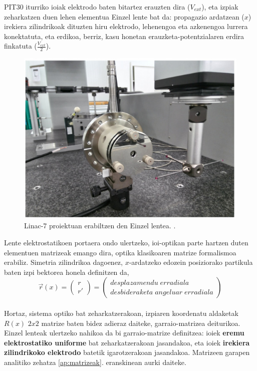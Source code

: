 \documentclass[12pt]{article}
\numberwithin{figure}{section}
\numberwithin{equation}{section}
\begin{document}
PIT30 iturriko ioiak elektrodo baten bitartez erauzten dira ($V_{ext}$), eta izpiak zeharkatzen duen lehen elementua Einzel lente bat da: propagazio ardatzean ($x$) irekiera zilindrikoak dituzten hiru elektrodo, lehenengoa eta azkenengoa lurrera konektatuta, eta erdikoa, berriz, kasu honetan erauzketa-potentzialaren erdira finkatuta ($\frac{V_{ext}}{2}$).

\begin{figure}[h]
    \centering
    \includegraphics[width=0.45\linewidth]{2 - Oinarri teorikoa/einzel lens.jpg}
    \caption{Linac-7 proiektuan erabiltzen den Einzel lentea. \cite{feuchtwanger_new_2022}.}
    \label{fig:enter-label}
\end{figure}

Lente elektrostatikoen portaera ondo ulertzeko, ioi-optikan parte hartzen duten elementuen matrizeak emango dira, optika klasikoaren matrize formalismoa erabiliz. Simetria zilindrikoa dagoenez, $x$-ardatzeko edozein posiziorako partikula baten izpi bektorea honela definitzen da,\\

\begin{equation}
    \vec{r}(x)= \begin{pmatrix}
        r \\
        r' 
    \end{pmatrix} = 
    \begin{pmatrix}
        desplazamendu\; erradiala\\
        desbideraketa\; angeluar\; erradiala
    \end{pmatrix}
\end{equation}\\

Hortaz, sistema optiko bat zeharkatzerakoan, izpiaren koordenatu aldaketak $R(x)$ $2x2$ matrize baten bidez adieraz daiteke, garraio-matrizea deiturikoa. Einzel lenteak ulertzeko nahikoa da bi garraio-matrize definitzea: ioiek \textbf{eremu elektrostatiko uniforme} bat zeharkatzerakoan jasandakoa, eta ioiek \textbf{irekiera zilindrikoko elektrodo} batetik igarotzerakoan jasandakoa. Matrizeen garapen analitiko zehatza \ref{ap:matrizeak}. eranskinean aurki daiteke.
\end{document}
